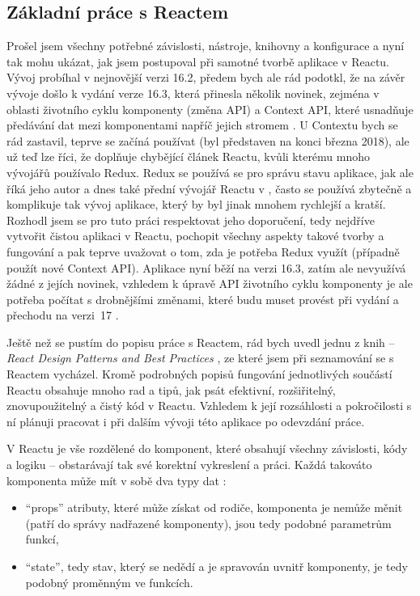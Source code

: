     \subsection{Základní práce s Reactem}\label{sec:zakladniPraceSReactem}
    Prošel jsem všechny potřebné závislosti, nástroje, knihovny a konfigurace a nyní tak mohu ukázat, jak jsem postupoval při samotné tvorbě aplikace v Reactu. Vývoj probíhal v nejnovější verzi 16.2, předem bych ale rád podotkl, že na závěr vývoje došlo k vydání verze 16.3, která přinesla několik novinek, zejména v oblasti životního cyklu komponenty (změna API) a Context API, které usnadňuje předávání dat mezi komponentami napříč jejich stromem \cite{react-blog1}. U Contextu bych se rád zastavil, teprve se začíná používat (byl představen na konci března 2018), ale už teď lze říci, že doplňuje chybějící článek Reactu, kvůli kterému mnoho vývojářů používalo Redux. Redux se používá se pro správu stavu aplikace, jak ale říká jeho autor a dnes také přední vývojář Reactu v \cite{react-blog3}, často se používá zbytečně a komplikuje tak vývoj aplikace, který by byl jinak mnohem rychlejší a kratší. Rozhodl jsem se pro tuto práci respektovat jeho doporučení, tedy nejdříve vytvořit čistou aplikaci v Reactu, pochopit všechny aspekty takové tvorby a fungování a pak teprve uvažovat o tom, zda je potřeba Redux využít (případně použít nové Context API). Aplikace nyní běží na verzi 16.3, zatím ale nevyužívá žádné z jejích novinek, vzhledem k úpravě API životního cyklu komponenty je ale potřeba počítat s drobnějšími změnami, které budu muset provést při vydání a přechodu na verzi~17 \cite{react-blog2}.
    
    Ještě než se pustím do popisu práce s Reactem, rád bych uvedl jednu z knih -- \textit{React Design Patterns and Best Practices} \cite{react-kniha}, ze které jsem při seznamování se s Reactem vycházel. Kromě podrobných popisů fungování jednotlivých součástí Reactu obsahuje mnoho rad a tipů, jak psát efektivní, rozšiřitelný, znovupoužitelný a čistý kód v Reactu. Vzhledem k její rozsáhlosti a pokročilosti s ní plánuji pracovat i při dalším vývoji této aplikace po odevzdání práce.
    
    V Reactu je vše rozdělené do komponent, které obsahují všechny závislosti, kódy a logiku -- obstarávají tak své korektní vykreslení a práci. Každá takováto komponenta může mít v sobě dva typy dat \cite{react-docs1}:
    \begin{itemize}
        \item \enquote{props} atributy, které může získat od rodiče, komponenta je nemůže měnit (patří do správy nadřazené komponenty), jsou tedy podobné parametrům funkcí,
        \item \enquote{state}, tedy stav, který se nedědí a je spravován uvnitř komponenty, je tedy podobný proměnným ve funkcích.
    \end{itemize}
    
